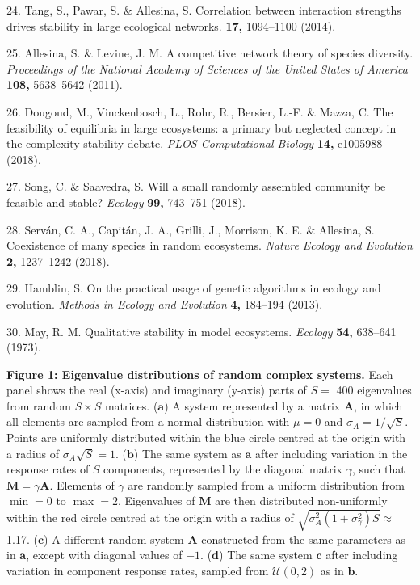 \documentclass[]{article}
\begin{document}
\hypertarget{ref-Tang2014c}{}
24. Tang, S., Pawar, S. \& Allesina, S. Correlation between interaction
strengths drives stability in large ecological networks. \textbf{17,}
1094--1100 (2014).

\hypertarget{ref-Allesina2011}{}
25. Allesina, S. \& Levine, J. M. A competitive network theory of
species diversity. \emph{Proceedings of the National Academy of Sciences
of the United States of America} \textbf{108,} 5638--5642 (2011).

\hypertarget{ref-Dougoud2018}{}
26. Dougoud, M., Vinckenbosch, L., Rohr, R., Bersier, L.-F. \& Mazza, C.
The feasibility of equilibria in large ecosystems: a primary but
neglected concept in the complexity-stability debate. \emph{PLOS
Computational Biology} \textbf{14,} e1005988 (2018).

\hypertarget{ref-Song2018}{}
27. Song, C. \& Saavedra, S. Will a small randomly assembled community
be feasible and stable? \emph{Ecology} \textbf{99,} 743--751 (2018).

\hypertarget{ref-Servan2018}{}
28. Serván, C. A., Capitán, J. A., Grilli, J., Morrison, K. E. \&
Allesina, S. Coexistence of many species in random ecosystems.
\emph{Nature Ecology and Evolution} \textbf{2,} 1237--1242 (2018).

\hypertarget{ref-Hamblin2013}{}
29. Hamblin, S. On the practical usage of genetic algorithms in ecology
and evolution. \emph{Methods in Ecology and Evolution} \textbf{4,}
184--194 (2013).

\hypertarget{ref-May1973}{}
30. May, R. M. Qualitative stability in model ecosystems. \emph{Ecology}
\textbf{54,} 638--641 (1973).

\clearpage

\textbf{Figure 1: Eigenvalue distributions of random complex systems.}
Each panel shows the real (x-axis) and imaginary (y-axis) parts of
\(S =\) 400 eigenvalues from random \(S \times S\) matrices.
(\(\textbf{a}\)) A system represented by a matrix \(\mathbf{A}\), in
which all elements are sampled from a normal distribution with
\(\mu = 0\) and \(\sigma_{A} = 1/\sqrt{S}\). Points are uniformly
distributed within the blue circle centred at the origin with a radius
of \(\sigma_{A} \sqrt{S} = 1\). (\(\textbf{b}\)) The same system as
\(\textbf{a}\) after including variation in the response rates of \(S\)
components, represented by the diagonal matrix \(\gamma\), such that
\(\mathbf{M} = \gamma\mathbf{A}\). Elements of \(\gamma\) are randomly
sampled from a uniform distribution from \(\min = 0\) to \(\max = 2\).
Eigenvalues of \(\mathbf{M}\) are then distributed non-uniformly within
the red circle centred at the origin with a radius of
\(\sqrt{\sigma^{2}_{A}(1 + \sigma^{2}_{\gamma})S} \approx\) 1.17.
(\(\textbf{c}\)) A different random system \(\mathbf{A}\) constructed
from the same parameters as in \(\textbf{a}\), except with diagonal
values of \(-1\). (\(\textbf{d}\)) The same system \(\textbf{c}\) after
including variation in component response rates, sampled from
\(\mathcal{U}(0, 2)\) as in \(\textbf{b}\).
\end{document}
